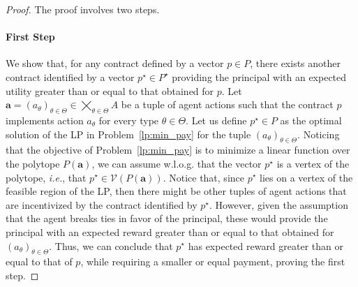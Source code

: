 \theoremOutcomes*

\begin{proof}
	The proof involves two steps.
	\paragraph{First Step} We show that, for any contract defined by a vector $p \in P$, there exists another contract identified by a vector $p^\star \in P^\star$ providing the principal with an expected utility greater than or equal to that obtained for $p$.
	Let $\textbf{a}=(a_\theta)_{\theta \in \Theta} \in \bigtimes_{\theta \in \Theta} A$ be a tuple of agent actions such that the contract $p$ implements action $a_\theta$ for every type $\theta \in \Theta$.
	Let us define $p^\star \in P$ as the optimal solution of the LP in Problem~\eqref{lp:min_pay} for the tuple $(a_\theta)_{\theta \in \Theta}$.
	Noticing that the objective of Problem~\eqref{lp:min_pay} is to minimize a linear function over the polytope $P(\textbf{a})$, we can assume w.l.o.g. that the vector $p^\star$ is a vertex of the polytope, \emph{i.e.}, that $p^\star \in \mathcal{V} (P(\textbf{a}))$.
	Notice that, since $p^\star$ lies on a vertex of the feasible region of the LP, then there might be other tuples of agent actions that are incentivized by the contract identified by $p^\star$.
	However, given the assumption that the agent breaks ties in favor of the principal, these would provide the principal with an expected reward greater than or equal to that obtained for $(a_\theta)_{\theta \in \Theta}$.
	Thus, we can conclude that $p^\star$ has expected reward greater than or equal to that of $p$, while requiring a smaller or equal payment, proving the first step.
	

\end{proof}

